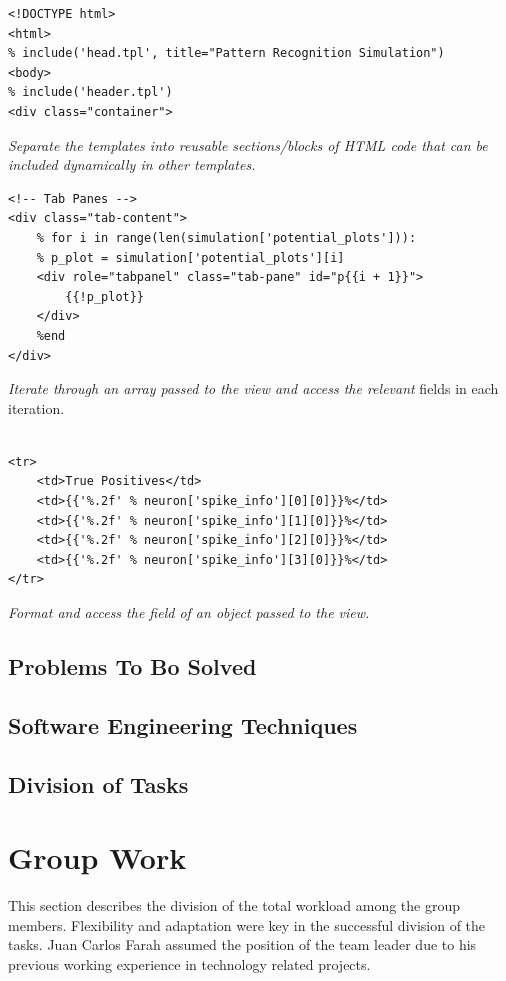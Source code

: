 \documentclass[a4paper,11pt]{article}
\begin{document}
\begin{verbatim}
<!DOCTYPE html>
<html>
% include('head.tpl', title="Pattern Recognition Simulation")
<body>
% include('header.tpl')
<div class="container">
\end{verbatim}
\textit{Separate the templates into reusable sections/blocks of HTML code that can be included dynamically in other templates.}    
\newpage 


\begin{verbatim}
<!-- Tab Panes -->
<div class="tab-content">
    % for i in range(len(simulation['potential_plots'])):
    % p_plot = simulation['potential_plots'][i]
    <div role="tabpanel" class="tab-pane" id="p{{i + 1}}">
        {{!p_plot}}
    </div>
    %end
</div>
\end{verbatim}
\textit{Iterate through an array passed to the view and access the relevant} fields in each iteration.
\\
\\

\begin{verbatim}
<tr>
    <td>True Positives</td>
    <td>{{'%.2f' % neuron['spike_info'][0][0]}}%</td>
    <td>{{'%.2f' % neuron['spike_info'][1][0]}}%</td>
    <td>{{'%.2f' % neuron['spike_info'][2][0]}}%</td>
    <td>{{'%.2f' % neuron['spike_info'][3][0]}}%</td>
</tr>
  \end{verbatim}
\textit{Format and access the field of an object passed to the view.}



\newpage

\subsection{Problems To Bo Solved}

\subsection{Software Engineering Techniques}

\subsection{Division of Tasks}


\clearpage
\section{Group Work}

This section describes the division of the total workload among the group members. Flexibility and adaptation were key in the successful division of the tasks. Juan Carlos Farah assumed the position of the team leader due to his previous working experience in technology related projects.
\end{document}
